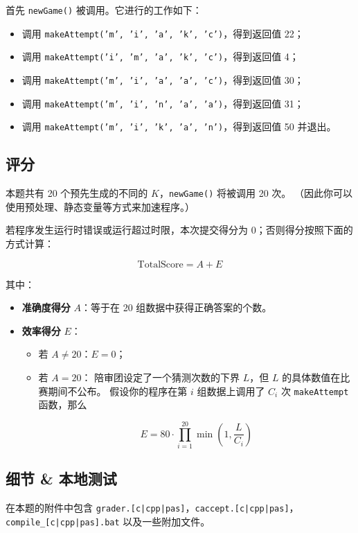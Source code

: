\documentclass[UTF8, 11pt, a4paper]{article}
\begin{document}
首先 \texttt{newGame()} 被调用。它进行的工作如下：
\begin{itemize}
    \item 调用 \texttt{makeAttempt('m', 'i', 'a', 'k', 'c')}，得到返回值 22；
    \item 调用 \texttt{makeAttempt('i', 'm', 'a', 'k', 'c')}，得到返回值 4；
    \item 调用 \texttt{makeAttempt('m', 'i', 'a', 'a', 'c')}，得到返回值 30；
    \item 调用 \texttt{makeAttempt('m', 'i', 'n', 'a', 'a')}，得到返回值 31；
    \item 调用 \texttt{makeAttempt('m', 'i', 'k', 'a', 'n')}，得到返回值 50 并退出。
\end{itemize}

\subsection*{评分}
本题共有 20 个预先生成的不同的 $K$，\texttt{newGame()} 将被调用 20 次。%
（因此你可以使用预处理、静态变量等方式来加速程序。）

若程序发生运行时错误或运行超过时限，本次提交得分为 0；否则得分按照下面的方式计算：

$$
    \mathrm{TotalScore} = A + E
$$

其中：
\begin{itemize}
    \item \textbf{准确度得分} $A$：等于在 20 组数据中获得正确答案的个数。
    \item \textbf{效率得分} $E$：
    \begin{itemize}
        \item 若 $A \neq 20$：$E = 0$；
        \item 若 $A = 20$：
            陪审团设定了一个猜测次数的下界 $L$，但 $L$ 的具体数值在比赛期间不公布。
            假设你的程序在第 $i$ 组数据上调用了 $C_i$ 次 \texttt{makeAttempt} 函数，那么

            $$
                E = 80 \cdot \prod_{i = 1}^{20} \min\left(1, \frac{L}{C_i}\right)
            $$
    \end{itemize}
\end{itemize}

\subsection*{细节 \& 本地测试}
在本题的附件中包含 \texttt{grader.[c|cpp|pas]}，\texttt{caccept.[c|cpp|pas]}，%
\texttt{compile\_[c|cpp|pas].bat} 以及一些附加文件。
\end{document}
